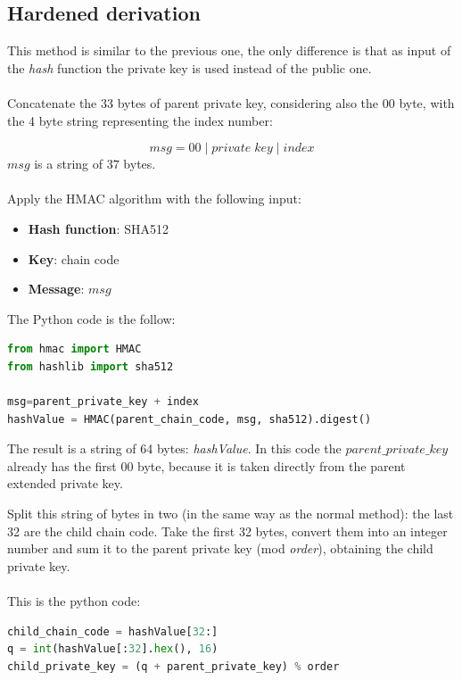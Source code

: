 \subsection{Hardened derivation}
This method is similar to the previous one, the only difference is that as input of the \textit{hash} function the private key is used instead of the public one. \\ \\
Concatenate the 33 bytes of parent private key, considering also the $00$ byte, with the 4 byte string representing the index number:

\begin{equation*}
msg = 00 \;|\; private\;key \;|\; index
\end{equation*}
$msg$ is a string of $37$ bytes. \\ \\
Apply the HMAC algorithm with the following input:

\begin{itemize}[label=$\odot$]
	\item \textbf{Hash function}: SHA512
	\item \textbf{Key}: chain code
	\item \textbf{Message}: $msg$
\end{itemize}
The Python code is the follow:
\begin{lstlisting}[language=Python]
from hmac import HMAC
from hashlib import sha512

msg=parent_private_key + index
hashValue = HMAC(parent_chain_code, msg, sha512).digest()
\end{lstlisting}
\begin{flushleft}
	The result is a string of 64 bytes: \textit{hashValue}. In this code the $parent\_private\_key$ already has the first $00$ byte, because it is taken directly from the parent extended private key.
\end{flushleft}
Split this string of bytes in two (in the same way as the normal method): the last 32 are the child chain code. Take the first 32 bytes, convert them into an integer number and sum it to the parent private key (mod \textit{order}), obtaining the child private key.\\ \\
This is the python code:

\begin{lstlisting}[language=Python]
child_chain_code = hashValue[32:]
q = int(hashValue[:32].hex(), 16)
child_private_key = (q + parent_private_key) % order
\end{lstlisting}


